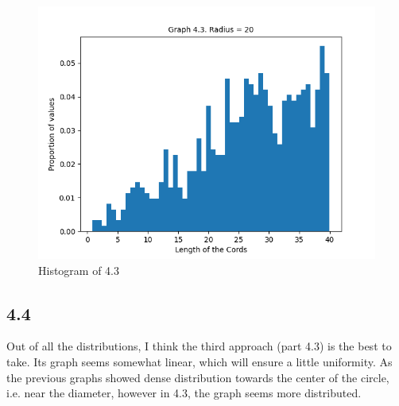 \documentclass[answers]{exam}
\begin{document}
    \begin{figure}[h]
        \caption{Histogram of 4.3}
        \centering
        \includegraphics[scale=0.7]{Q4/Q4(3).png}
    \end{figure}
\newpage
\subsection*{4.4}
    \begin{framed}
        Out of all the distributions, I think the third approach (part 4.3) is the best to take. Its graph seems somewhat linear, which will ensure a little uniformity. As the previous graphs showed dense distribution towards the center of the circle, i.e. near the diameter, however in 4.3, the graph seems more distributed.
    \end{framed}
\end{document}
